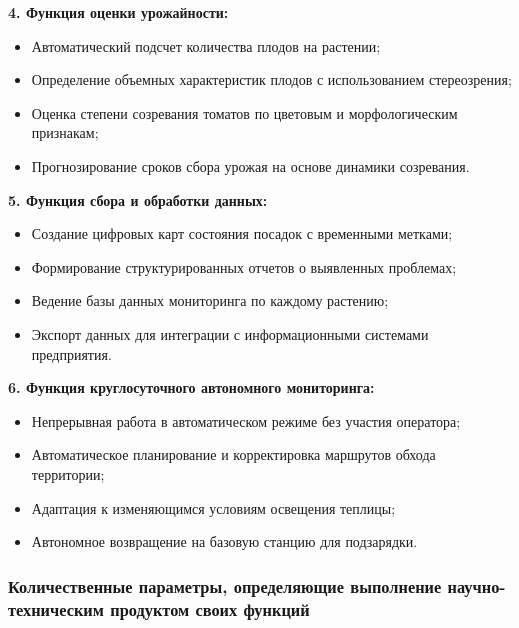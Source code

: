 \documentclass[12pt,a4paper]{article}
\begin{document}
\textbf{4. Функция оценки урожайности:}
\begin{itemize}
\item Автоматический подсчет количества плодов на растении;
\item Определение объемных характеристик плодов с использованием стереозрения;
\item Оценка степени созревания томатов по цветовым и морфологическим признакам;
\item Прогнозирование сроков сбора урожая на основе динамики созревания.
\end{itemize}

\textbf{5. Функция сбора и обработки данных:}
\begin{itemize}
\item Создание цифровых карт состояния посадок с временными метками;
\item Формирование структурированных отчетов о выявленных проблемах;
\item Ведение базы данных мониторинга по каждому растению;
\item Экспорт данных для интеграции с информационными системами предприятия.
\end{itemize}

\textbf{6. Функция круглосуточного автономного мониторинга:}
\begin{itemize}
\item Непрерывная работа в автоматическом режиме без участия оператора;
\item Автоматическое планирование и корректировка маршрутов обхода территории;
\item Адаптация к изменяющимся условиям освещения теплицы;
\item Автономное возвращение на базовую станцию для подзарядки.
\end{itemize}

\subsubsection{Количественные параметры, определяющие выполнение научно-техническим продуктом своих функций}
\end{document}

